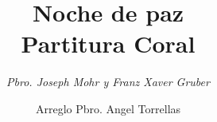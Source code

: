 \documentclass[letterpaper]{report}
\title{ \textbf{ \Huge Noche de paz  } \\ { \Huge Partitura Coral } }
\author{ \textit{ \huge Pbro. Joseph Mohr y  Franz Xaver Gruber } }
\date{ \LARGE Arreglo Pbro. Angel Torrellas }
\begin{document}
    
    \maketitle
     
    \begin{landscape}
        {%
\parindent 0pt
\noindent
\ifx\preLilyPondExample \undefined
\else
  \expandafter\preLilyPondExample
\fi
\def\lilypondbook{}%

\ifx\postLilyPondExample \undefined
\else
  \expandafter\postLilyPondExample
\fi
}    
    \end{landscape}
    
    {%
\parindent 0pt
\noindent
\ifx\preLilyPondExample \undefined
\else
  \expandafter\preLilyPondExample
\fi
\def\lilypondbook{}%

\ifx\postLilyPondExample \undefined
\else
  \expandafter\postLilyPondExample
\fi
}
    \clearpage
    
    {%
\parindent 0pt
\noindent
\ifx\preLilyPondExample \undefined
\else
  \expandafter\preLilyPondExample
\fi
\def\lilypondbook{}%

\ifx\postLilyPondExample \undefined
\else
  \expandafter\postLilyPondExample
\fi
}
    \clearpage
    
    {%
\parindent 0pt
\noindent
\ifx\preLilyPondExample \undefined
\else
  \expandafter\preLilyPondExample
\fi
\def\lilypondbook{}%

\ifx\postLilyPondExample \undefined
\else
  \expandafter\postLilyPondExample
\fi
}
    \clearpage
    
    {%
\parindent 0pt
\noindent
\ifx\preLilyPondExample \undefined
\else
  \expandafter\preLilyPondExample
\fi
\def\lilypondbook{}%

\ifx\postLilyPondExample \undefined
\else
  \expandafter\postLilyPondExample
\fi
}
    \clearpage
    
\end{document}
